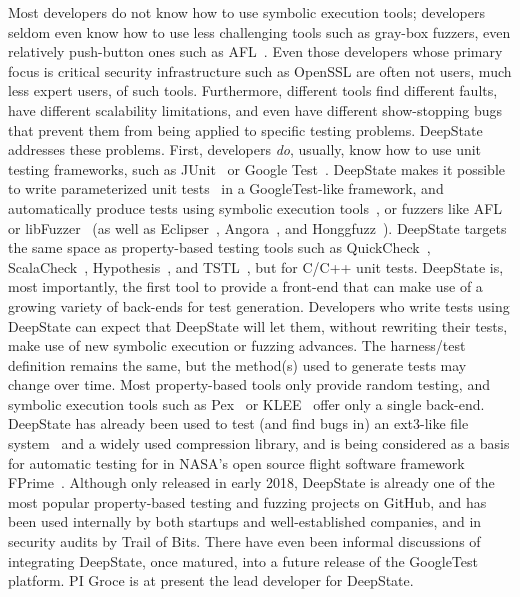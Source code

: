 Most developers do not know how to use symbolic execution tools; developers seldom even know how to use less challenging tools such as gray-box fuzzers, even relatively push-button ones such as AFL~\cite{aflfuzz}.  Even those developers whose primary focus is critical security infrastructure such as OpenSSL are often not users, much less expert users, of such tools.  Furthermore, different tools find different faults, have different scalability limitations, and even have different show-stopping bugs that prevent them from being applied to specific testing problems.  DeepState~\cite{DeepState,DeepStateTutorial} addresses these problems.  First, developers \emph{do}, usually, know how to use unit testing frameworks, such as JUnit~\cite{JUnit} or Google Test~\cite{GoogleTest}. DeepState makes it possible to write parameterized unit tests~\cite{ParamUnit} in a GoogleTest-like framework, and automatically produce tests using symbolic execution tools~\cite{angr1,angr2,angr3,Manticore}, or fuzzers like AFL~\cite{aflfuzz} or libFuzzer~\cite{libFuzzer} (as well as Eclipser~\cite{eclipser}, Angora~\cite{angora}, and Honggfuzz~\cite{Honggfuzz}).  DeepState targets the same space as property-based testing tools such as QuickCheck~\cite{ClaessenH00}, ScalaCheck~\cite{ScalaCheckDoc}, Hypothesis~\cite{Hypothesis}, and TSTL~\cite{NFM15,tstlsttt}, but for C/C++ unit tests. DeepState is, most importantly, the first tool to provide a front-end that can make use of a growing variety of back-ends for test generation.  Developers who write tests using DeepState can expect that DeepState will let them, without rewriting their tests, make use of new symbolic execution or fuzzing advances.  The harness/test definition remains the same, but the method(s) used to generate tests may change over time.  Most property-based tools only provide random testing, and symbolic execution tools such as Pex~\cite{Pex,UnitMeister} or KLEE~\cite{KLEE} offer only a single back-end.
DeepState has already been used to test (and find bugs in) an ext3-like file system~\cite{testfs,testfsrepo} and a widely used compression library, and is being considered as a basis for automatic testing for in NASA's open source flight software framework FPrime~\cite{fprime,fprimerepo}.  Although only released in early 2018, DeepState is already one of the most popular property-based testing and fuzzing projects on GitHub, and has been used internally by both startups and well-established companies, and in security audits by Trail of Bits.  There have even been informal discussions of integrating DeepState, once matured, into a future release of the GoogleTest~\cite{GoogleTest} platform.  PI Groce is at present the lead developer for DeepState.